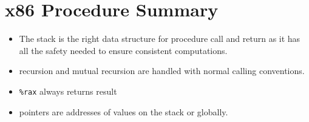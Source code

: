 \documentclass[12pt]{book}
\begin{document}
\section*{x86 Procedure Summary}
\begin{itemize}
        \item The stack is the right data structure for procedure call and return as it has all the safety
                needed to ensure consistent computations.
        \item recursion and mutual recursion are handled with normal calling conventions.
        \item \texttt{\%rax} always returns result
        \item pointers are addresses of values on the stack or globally.
\end{itemize}
\end{document}
